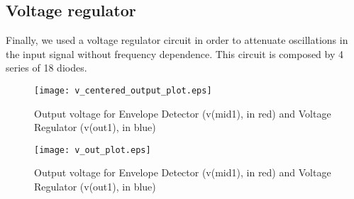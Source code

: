\subsection{Voltage regulator}
Finally, we used a voltage regulator circuit in order to attenuate oscillations in the input signal without frequency dependence. This circuit is composed by 4 series of 18 diodes.

\begin{figure}[H] \centering
\texttt{[image: v\_centered\_output\_plot.eps]}
\caption{Output voltage for Envelope Detector (v(mid1), in red) and Voltage Regulator (v(out1), in blue)}
\label{fig:phase_sim}
\end{figure}

\begin{figure}[H] \centering
\texttt{[image: v\_out\_plot.eps]}
\caption{Output voltage for Envelope Detector (v(mid1), in red) and Voltage Regulator (v(out1), in blue)}
\label{fig:phase_sim}
\end{figure}
